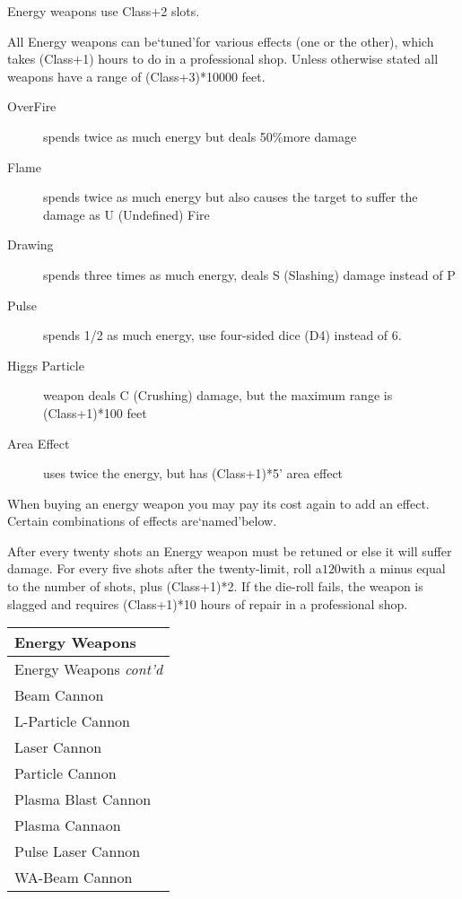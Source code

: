 \documentclass[twoside]{book}
\begin{document}
    {  
    Energy weapons use Class+2 slots.
    }
  
    {  
    All Energy weapons can be`tuned'for various effects (one or the other), which takes (Class+1) hours to do in a professional shop. Unless otherwise stated all weapons have a range of (Class+3)*10000 feet.
    }
  
\begin{description}
    
  \item[OverFire] 
    {  
    spends twice as much energy but deals 50\%more damage
    }
  
  \item[Flame] 
    {  
    spends twice as much energy but also causes the target to suffer the damage as U (Undefined) Fire
    }
  
  \item[Drawing] 
    {  
    spends three times as much energy, deals S (Slashing) damage instead of P
    }
  
  \item[Pulse] 
    {  
    spends 1/2 as much energy, use four-sided dice (D4) instead of 6.
    }
  
  \item[Higgs Particle] 
    {  
    weapon deals C (Crushing) damage, but the maximum range is (Class+1)*100 feet
    }
  
  \item[Area Effect] 
    {  
    uses twice the energy, but has (Class+1)*5' area effect
    }
  
\end{description}
  
    {  
    When buying an energy weapon you may pay its cost again to add an effect. Certain combinations of effects are`named'below.
    }
  
    {  
    After every twenty shots an Energy weapon must be retuned or else it will suffer damage. For every five shots after the twenty-limit, roll a\ensuremath{1}\ensuremath{20}\ensuremath{}with a minus equal to the number of shots, plus (Class+1)*2. If the die-roll fails, the weapon is slagged and requires (Class+1)*10 hours of repair in a professional shop.
    }
  
\begin{longtable}{p{1.25in}} 
  Energy Weapons\\
  \hline
  \hline
  \endfirsthead
  Energy Weapons \textit{cont'd}
         \\
  \hline
  \endhead
\raggedright Beam Cannon\tabularnewline
      \raggedright L-Particle Cannon\tabularnewline
      \raggedright Laser Cannon\tabularnewline
      \raggedright Particle Cannon\tabularnewline
      \raggedright Plasma Blast Cannon\tabularnewline
      \raggedright Plasma Cannaon\tabularnewline
      \raggedright Pulse Laser Cannon\tabularnewline
      \raggedright WA-Beam Cannon\tabularnewline
      
\end{longtable}
    
\end{document}
